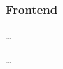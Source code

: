 \newpage



\subsubsection{Frontend}
\label{sec:frontend}

\label{sec:component}

\dots

\newpage


\label{sec:service_frontend}

\dots

\newpage
